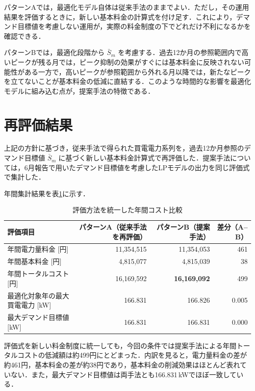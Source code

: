 \documentclass[a4paper,11pt,dvipdfmx]{jsarticle}
\begin{document}
パターンAでは，最適化モデル自体は従来手法のままでよい．ただし，その運用結果を評価するときに，新しい基本料金の計算式を付け足す．これにより，デマンド目標値を考慮しない運用が，実際の料金制度の下でどれだけ不利になるかを確認できる．

パターンBでは，最適化段階から $\bar{S}_{m}$ を考慮する．過去12か月の参照範囲内で高いピークが残る月では，ピーク抑制の効果がすぐには基本料金に反映されない可能性がある一方で，高いピークが参照範囲から外れる月以降では，新たなピークを立てないことが基本料金の低減に直結する．このような時間的な影響を最適化モデルに組み込む点が，提案手法の特徴である．

\section{再評価結果}
上記の方針に基づき，従来手法で得られた買電電力系列を，過去12か月参照のデマンド目標値 $\bar{S}_{m}$ に基づく新しい基本料金計算式で再評価した．提案手法については，6月報告で用いたデマンド目標値を考慮したLPモデルの出力を同じ評価式で集計した．

年間集計結果を表\ref{tab:reassessment_results}に示す．

\begin{table}[H]
    \centering
    \caption{評価方法を統一した年間コスト比較}
    \label{tab:reassessment_results}
    \begin{tabular}{lrrr}
        \toprule
        評価項目                   & パターンA（従来手法を再評価） & パターンB（提案手法）     & 差分（A--B） \\
        \midrule
        年間電力量料金 [円]            & 11,354,515         & 11,354,053       & 461      \\
        年間基本料金 [円]             & 4,815,077          & 4,815,039        & 38       \\
        年間トータルコスト [円]          & 16,169,592         & \textbf{16,169,092} & 499      \\
        最適化対象年の最大買電電力 [kW]     & 166.831            & 166.826          & 0.005    \\
        最大デマンド目標値 [kW]          & 166.831            & 166.831          & 0.000    \\
        \bottomrule
    \end{tabular}
\end{table}

評価式を新しい料金制度に統一しても，今回の条件では提案手法による年間トータルコストの低減額は約499円にとどまった．内訳を見ると，電力量料金の差が約461円，基本料金の差が約38円であり，基本料金の削減効果はほとんど表れていない．また，最大デマンド目標値は両手法とも166.831\,kWでほぼ一致している．
\end{document}
